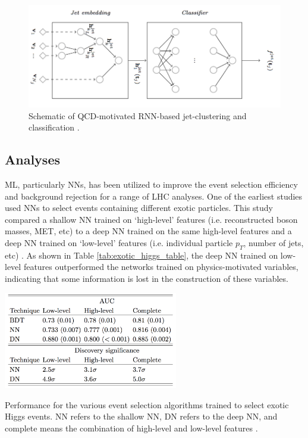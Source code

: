 \begin{figure}[htb!]
    \centering
    \includegraphics[width=4.5in]{figures/chapter4/rnn_jet_cluster.png}
    \caption{Schematic of QCD-motivated RNN-based jet-clustering and classification \cite{qcd_clustering}.}
    \label{fig:rnn_jet_cluster}
\end{figure}

\subsection{Analyses}
ML, particularly NNs, has been utilized to improve the event selection efficiency and background rejection for a range of LHC analyses. One of the earliest studies used NNs to select events containing different exotic particles. This study compared a shallow NN trained on `high-level' features (i.e. reconstructed boson masses, MET, etc) to a deep NN trained on the same high-level features and a deep NN trained on `low-level' features (i.e. individual particle $p_T$, number of jets, etc) \cite{nn_exotic_particles}. As shown in Table \ref{tab:exotic_higgs_table}, the deep NN trained on low-level features outperformed the networks trained on physics-motivated variables, indicating that some information is lost in the construction of these variables.\\

\begin{table}[htb!]
    \centering
    \includegraphics[width=3in]{figures/chapter4/exotic_higgs_table.png}
    \caption{Performance for the various event selection algorithms trained to select exotic Higgs events. NN refers to the shallow NN, DN refers to the deep NN, and complete means the combination of high-level and low-level features \cite{nn_exotic_particles}.}
    \label{tab:exotic_higgs_table}
\end{table}

